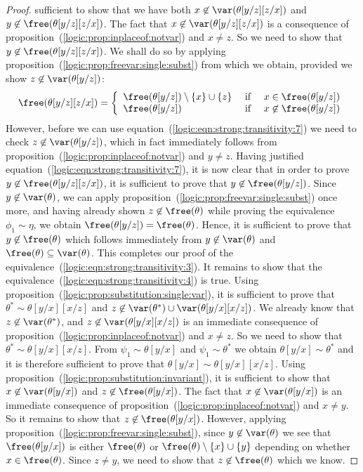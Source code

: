 \begin{proof}
sufficient to show that we have both
$x\not\in\var(\theta[y/z][z/x])$ and
$y\not\in\free(\theta[y/z][z/x])$. The fact that
$x\not\in\var(\theta[y/z][z/x])$ is a consequence of
proposition~(\ref{logic:prop:inplaceof:notvar}) and $x\neq z$. So we
need to show that $y\not\in\free(\theta[y/z][z/x])$. We shall do so
by applying proposition~(\ref{logic:prop:freevar:single:subst}) from
which we obtain, provided we show $z\not\in\var(\theta[y/z])$:
    \begin{equation}\label{logic:eqn:strong:transitivity:7}
    \free(\theta[y/z][z/x])=\left\{\begin{array}{lcl}
    \free(\theta[y/z])\setminus\{x\}\cup\{z\}&\mbox{\ if\ }&x\in\free(\theta[y/z])\\
    \free(\theta[y/z])&\mbox{\ if\ }&x\not\in\free(\theta[y/z])
    \end{array}
    \right.
    \end{equation}
However, before we can use
equation~(\ref{logic:eqn:strong:transitivity:7}) we need to check
$z\not\in\var(\theta[y/z])$, which in fact immediately follows from
proposition~(\ref{logic:prop:inplaceof:notvar}) and $y\neq z$.
Having justified equation~(\ref{logic:eqn:strong:transitivity:7}),
it is now clear that in order to prove
$y\not\in\free(\theta[y/z][z/x])$, it is sufficient to prove that
$y\not\in\free(\theta[y/z])$. Since $y\not\in\var(\theta)$, we can
apply proposition~(\ref{logic:prop:freevar:single:subst}) once more,
and having already shown $z\not\in\free(\theta)$ while proving the
equivalence $\phi_{1}\sim\eta$, we obtain
$\free(\theta[y/z])=\free(\theta)$. Hence, it is sufficient to prove
that $y\not\in\free(\theta)$ which follows immediately from
$y\not\in\var(\theta)$ and $\free(\theta)\subseteq\var(\theta)$.
This completes our proof of the
equivalence~(\ref{logic:eqn:strong:transitivity:3}). It remains to
show that the equivalence~(\ref{logic:eqn:strong:transitivity:4}) is
true. Using proposition~(\ref{logic:prop:substitution:single:var}),
it is sufficient to prove that $\theta^{*}\sim\theta[y/x][x/z]$ and
$z\not\in\var(\theta^{*})\cup\var(\theta[y/x][x/z])$. We already
know that $z\not\in\var(\theta^{*})$, and
$z\not\in\var(\theta[y/x][x/z])$ is an immediate consequence of
proposition~(\ref{logic:prop:inplaceof:notvar}) and $x\neq z$. So we
need to show that $\theta^{*}\sim\theta[y/x][x/z]$. From
$\psi_{1}\sim\theta[y/x]$ and $\psi_{1}\sim\theta^{*}$ we obtain
$\theta[y/x]\sim\theta^{*}$ and it is therefore sufficient to prove
that $\theta[y/x]\sim\theta[y/x][x/z]$. Using
proposition~(\ref{logic:prop:substitution:invariant}), it is
sufficient to show that $x\not\in\var(\theta[y/x])$ and
$z\not\in\free(\theta[y/x])$. The fact that
$x\not\in\var(\theta[y/x])$ is an immediate consequence of
proposition~(\ref{logic:prop:inplaceof:notvar}) and $x\neq y$. So it
remains to show that $z\not\in\free(\theta[y/x])$. However, applying 
proposition~(\ref{logic:prop:freevar:single:subst}), since
$y\not\in\var(\theta)$ we see that $\free(\theta[y/x])$ is either
$\free(\theta)$ or $\free(\theta)\setminus\{x\}\cup\{y\}$ depending
on whether $x\in\free(\theta)$. Since $z\neq y$, we need to
show that $z\not\in\free(\theta)$ which we know.
\end{proof}

